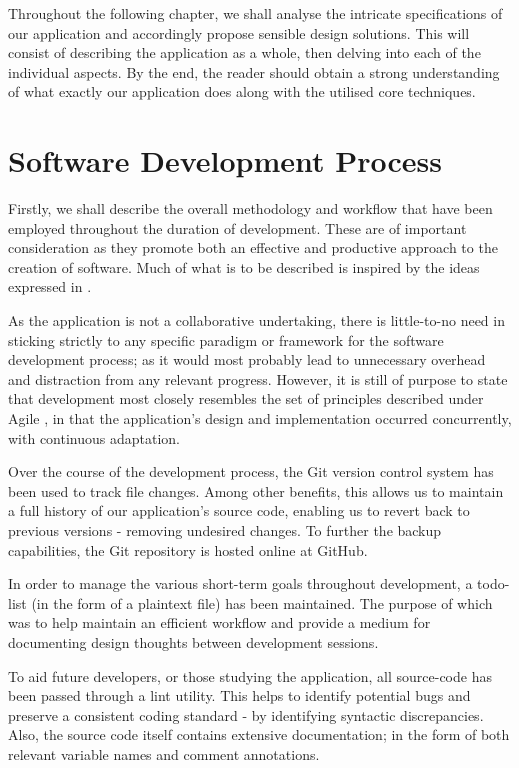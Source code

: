 \documentclass{standalone}
\begin{document}
	Throughout the following chapter, we shall analyse the intricate specifications of our application and accordingly propose sensible design solutions. This will consist of describing the application as a whole, then delving into each of the individual aspects. By the end, the reader should obtain a strong understanding of what exactly our application does along with the utilised core techniques.

	\section{Software Development Process} \label{sec:softwareDevelopmentProcess}
		Firstly, we shall describe the overall methodology and workflow that have been employed throughout the duration of development. These are of important consideration as they promote both an effective and productive approach to the creation of software. Much of what is to be described is inspired by the ideas expressed in \parencite{pragmaticProgrammer}.

		As the application is not a collaborative undertaking, there is little-to-no need in sticking strictly to any specific paradigm or framework for the software development process; as it would most probably lead to unnecessary overhead and distraction from any relevant progress. However, it is still of purpose to state that development most closely resembles the set of principles described under Agile \parencite{beck2001agile}, in that the application's design and implementation occurred concurrently, with continuous adaptation.

		Over the course of the development process, the Git \parencite{gitWeb} version control system has been used to track file changes. Among other benefits, this allows us to maintain a full history of our application's source code, enabling us to revert back to previous versions - removing undesired changes. To further the backup capabilities, the Git repository is hosted online at GitHub\parencite{TronGitRepo}.

		In order to manage the various short-term goals throughout development, a todo-list (in the form of a plaintext file) has been maintained. The purpose of which was to help maintain an efficient workflow and provide a medium for documenting design thoughts between development sessions.

		To aid future developers, or those studying the application, all source-code has been passed through a lint utility. This helps to identify potential bugs and preserve a consistent coding standard - by identifying syntactic discrepancies. Also, the source code itself contains extensive documentation; in the form of both relevant variable names and comment annotations.
\end{document}
